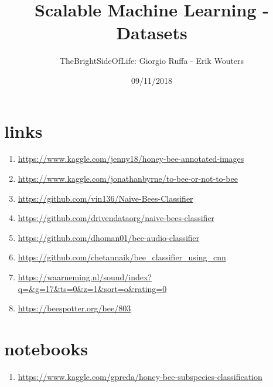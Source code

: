 \documentclass[a4paper]{article}
\title{Scalable Machine Learning - Datasets}
\author{TheBrightSideOfLife: Giorgio Ruffa - Erik Wouters}
\date{09/11/2018}
\begin{document}
\maketitle

\section{links}

\begin{enumerate}
\item \url{https://www.kaggle.com/jenny18/honey-bee-annotated-images}
\item \url{https://www.kaggle.com/jonathanbyrne/to-bee-or-not-to-bee}
\item \url{https://github.com/vin136/Naive-Bees-Classifier}
\item \url{https://github.com/drivendataorg/naive-bees-classifier}
\item \url{https://github.com/dhoman01/bee-audio-classifier}
\item \url{https://github.com/chetannaik/bee_classifier_using_cnn}
\item \url{https://waarneming.nl/sound/index?q=&g=17&ts=0&z=1&sort=o&rating=0}
\item \url{https://beespotter.org/bee/803}
\end{enumerate}

\section{notebooks}
\begin{enumerate}
    \item \url{https://www.kaggle.com/gpreda/honey-bee-subspecies-classification}
\end{enumerate}
\end{document}
